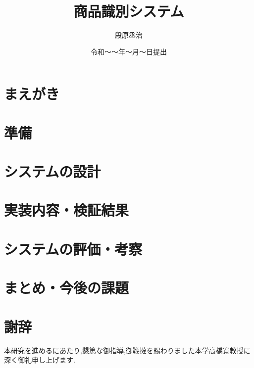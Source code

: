 

\newenvironment{indention}[1]{\par
\addtolength{\leftskip}{#1}
\begingroup}{\endgroup\par}

\title{商品識別システム}
\author{段原丞治}
\date{令和～～年～月～日提出}


\maketitle
\tableofcontents
\cleardoublepage
{}

\chapter{まえがき}


\chapter{準備}


\chapter{システムの設計}




\chapter{実装内容・検証結果}


\chapter{システムの評価・考察}


\chapter{まとめ・今後の課題}


\newpage
{}
\chapter*{謝辞}
本研究を進めるにあたり,懇篤な御指導,御鞭撻を賜わりました本学高橋寛教授に深く御礼申し上げます.

